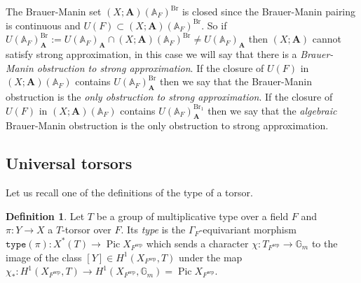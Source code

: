 \documentclass[a4paper,11pt,reqno]{amsart}
\newcommand{\G}{\mathbb{G}}
\newcommand{\A}{\mathbb{A}}
\DeclareMathOperator{\Pic}{Pic}
\DeclareMathOperator{\Br}{Br}
\DeclareMathOperator{\sep}{sep}
\theoremstyle{definition}
\newtheorem{definition}[theorem]{Definition}
\begin{document}
The Brauer-Manin set $(X ; \mathbf{A})(\A_F)^{\Br}$ is closed since the Brauer-Manin pairing is continuous and $U(F) \subset (X ; \mathbf{A})(\A_F)^{\Br}$. So if $U(\A_F)_{\mathbf{A}}^{\Br} := U(\A_F)_{\mathbf{A}} \cap (X ; \mathbf{A})(\A_F)^{\Br} \neq U(\A_F)_{\mathbf{A}}$ then $(X ; \mathbf{A})$ cannot satisfy strong approximation, in this case we will say that there is a \emph{Brauer-Manin obstruction to strong approximation}. If the closure of $U(F)$ in $(X; \mathbf{A})(\A_F)$ contains $U(\A_F)_{\mathbf{A}}^{\Br}$ then we say that the Brauer-Manin obstruction is the \emph{only obstruction to strong approximation}. If the closure of $U(F)$ in $(X; \mathbf{A})(\A_F)$ contains $U(\A_F)_{\mathbf{A}}^{\Br_1}$ then we say that the \emph{algebraic} Brauer-Manin obstruction is the only obstruction to strong approximation.
\subsection{Universal torsors}
Let us recall one of the definitions \cite[Lem.~2.3.1]{Skorogobatov2001Torsors} of the type of a torsor.
\begin{definition}
	Let $T$ be a group of multiplicative type over a field $F$ and $\pi: Y \to X$ a $T$-torsor over $F$. Its \emph{type} is the $\Gamma_F$-equivariant morphism $\texttt{type}(\pi): X^*(T) \to \Pic X_{F^{\sep}}$ which sends a character $\chi: T_{F^{\sep}} \to \G_m$ to the image of the class $[Y] \in H^1(X_{F^{\sep}}, T)$ under the map $\chi_*: H^1(X_{F^{\sep}}, T) \to H^1(X_{F^{\sep}}, \G_m) = \Pic X_{F^{\sep}}$.
\end{definition}
\end{document}
